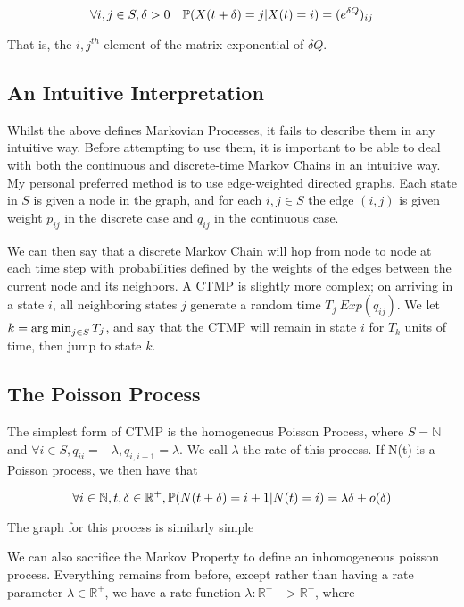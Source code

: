 $$
\forall i,j \in S, \delta>0 \quad \mathbb{P} (X(t+\delta)=j|X(t)=i) = (e^{\delta Q})_{ij}
$$

That is, the $i,j^{th}$ element of the matrix exponential of $\delta Q$.

\subsection{An Intuitive Interpretation}

Whilst the above defines Markovian Processes, it fails to describe them in any intuitive way. Before attempting to use them, it is important to be able to deal with both the continuous and discrete-time Markov Chains in an intuitive way. My personal preferred method is to use edge-weighted directed graphs\cite{mwgraph}. Each state in $S$ is given a node in the graph, and for each $i,j \in S$ the edge $(i,j)$ is given weight $p_{ij}$ in the discrete case and $q_{ij}$ in the continuous case.


We can then say that a discrete Markov Chain will hop from node to node at each time step with probabilities defined by the weights of the edges between the current node and its neighbors. A CTMP is slightly more complex; on arriving in a state $i$, all neighboring states $j$ generate a random time $T_j ~ Exp(q_{ij})$. We let $k = \operatorname*{arg\,min}_{j\in S} T_j$, and say that the CTMP will remain in state $i$ for $T_k$ units of time, then jump to state $k$.

\subsection{The Poisson Process}

The simplest form of CTMP is the homogeneous Poisson Process, where $S = \mathbb{N}$ and $\forall i \in S, q_{ii}=-\lambda, q_{i,i+1} = \lambda$. We call $\lambda$ the rate of this process. If N(t) is a Poisson process, we then have that

$$
\forall i \in \mathbb{N}, t,\delta \in \mathbb{R}^{+}, \mathbb{P} (N(t+\delta) = i+1 | N(t) = i) = \lambda \delta + o(\delta)
$$

The graph for this process is similarly simple

We can also sacrifice the Markov Property to define an inhomogeneous poisson process. Everything remains from before, except rather than having a rate parameter $\lambda \in \mathbb{R}^{+}$, we have a rate function $\lambda : \mathbb{R}^{+} -> \mathbb{R}^{+}$, where

